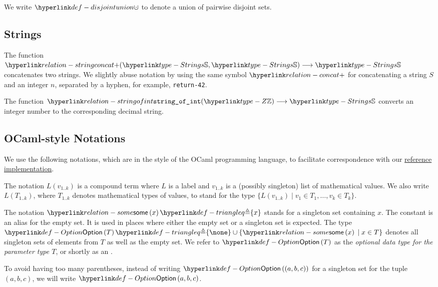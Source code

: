 We write $\disjointunion$ to denote a union of pairwise disjoint sets.

\subsection{Strings}
\hypertarget{relation-stringconcat}{}
The function $\concatstrings(\Strings, \Strings) \aslto \Strings$
concatenates two strings. %
We slightly abuse notation by using the same symbol $\concat$ for concatenating
a string $S$ and an integer $n$, separated by a hyphen, for example, \verb|return-42|.

\hypertarget{relation-stringofint}{}
The function $\stringofintname(\Z) \aslto \Strings$ converts an integer number
to the corresponding decimal string.

\subsection{OCaml-style Notations}
We use the following notations, which are in the style of the OCaml programming language,
to facilitate correspondence with our
\href{https://github.com/herd/herdtools7/tree/master/asllib}{reference implementation}.

The notation $L(v_{1..k})$ is a compound term where $L$ is a label and $v_{1..k}$ is a (possibly singleton) list of mathematical values.
We also write $L(T_{1..k})$, where $T_{1..k}$ denotes mathematical types of values, to stand for the type
$\{ L(v_{1..k}) \;|\; v_1\in T_1,\ldots,v_k\in T_k \}$.

\hypertarget{def-Option}{}
\begin{definition}
\hypertarget{relation-some}{}
The notation $\some{x} \triangleq \{x\}$ stands for a singleton
set containing $x$.
%
The constant  is an alias for the empty
set. It is used in places where either the empty set or a singleton set is expected.
%
The type $\Option{T} \triangleq \{ \none \} \cup \{ \some{x} \;|\; x\in T\}$ denotes
all singleton sets of elements from $T$ as well as the empty set.
%
We refer to $\Option{T}$ as the \emph{optional data type for the parameter
type $T$}, or shortly as an \emph{\optionalterm}.

To avoid having too many parentheses, instead of writing $\Option{(a, b, c)}$
for a singleton set for the tuple $(a, b, c)$, we will write $\Option{a, b, c}$.
\end{definition}

